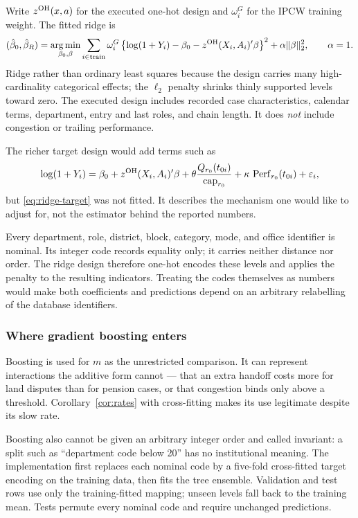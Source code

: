 \documentclass[11pt,a4paper]{article}
\theoremstyle{plain}
\theoremstyle{definition}
\theoremstyle{remark}
\DeclareMathOperator*{\argmin}{arg\,min}
\begin{document}
Write $z^{\rm OH}(x,a)$ for the executed one-hot design and $\omega_i^G$ for the IPCW training
weight. The fitted ridge is
\begin{equation}
(\hat\beta_0,\hat\beta_R)=\argmin_{\beta_0,\beta}
\sum_{i\in\mathrm{train}}\omega_i^G
\left\{\log(1+Y_i)-\beta_0-z^{\rm OH}(X_i,A_i)'\beta\right\}^2
+\alpha\lVert\beta\rVert_2^2,
\qquad \alpha=1.
\label{eq:ridge-asrun}
\end{equation}
Ridge rather than ordinary least squares because the design carries many high-cardinality
categorical effects; the $\ell_2$ penalty shrinks thinly supported levels toward zero. The
executed design includes recorded case characteristics, calendar terms, department, entry and
last roles, and chain length. It does \emph{not} include congestion or trailing performance.

The richer target design would add terms such as
\begin{equation}
\log(1+Y_i)=\beta_0+z^{\rm OH}(X_i,A_i)'\beta
+\theta\frac{Q_{r_0}(t_{0i})}{\operatorname{cap}_{r_0}}
+\kappa\,\operatorname{Perf}_{r_0}(t_{0i})+\varepsilon_i,
\label{eq:ridge-target}
\end{equation}
but \eqref{eq:ridge-target} was not fitted. It describes the mechanism one would like to adjust
for, not the estimator behind the reported numbers.

Every department, role, district, block, category, mode, and office identifier is nominal. Its
integer code records equality only; it carries neither distance nor order. The ridge design
therefore one-hot encodes these levels and applies the penalty to the resulting indicators.
Treating the codes themselves as numbers would make both coefficients and predictions depend on
an arbitrary relabelling of the database identifiers.

\subsubsection{Where gradient boosting enters}

Boosting is used for $m$ as the unrestricted comparison. It can represent interactions the
additive form cannot --- that an extra handoff costs more for land disputes than for pension
cases, or that congestion binds only above a threshold. Corollary~\ref{cor:rates} with
cross-fitting makes its use legitimate despite its slow rate.

Boosting also cannot be given an arbitrary integer order and called invariant: a split such as
``department code below 20'' has no institutional meaning. The implementation first replaces
each nominal code by a five-fold cross-fitted target encoding on the training data, then fits the
tree ensemble. Validation and test rows use only the training-fitted mapping; unseen levels fall
back to the training mean. Tests permute every nominal code and require unchanged predictions.
\end{document}
